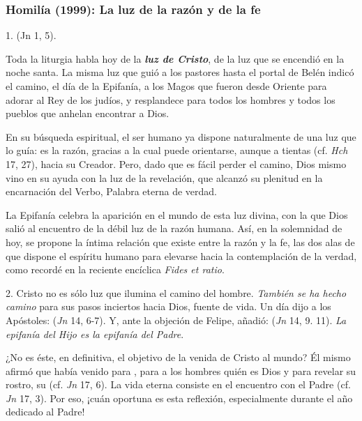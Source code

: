 			\subsubsection{Homilía (1999): La luz de la razón y de la fe}
			
				
				\begin{body}
					1.  (Jn 1, 5).
					
					Toda la liturgia habla hoy de la \emph{\textbf{luz de Cristo}}, de la luz que se encendió en la noche santa. La misma luz que guió a los pastores hasta el portal de Belén indicó el camino, el día de la Epifanía, a los Magos que fueron desde Oriente para adorar al Rey de los judíos, y resplandece para todos los hombres y todos los pueblos que anhelan encontrar a Dios.
					
					En su búsqueda espiritual, el ser humano ya dispone naturalmente de una luz que lo guía: es la razón, gracias a la cual puede orientarse, aunque a tientas (cf. \emph{Hch} 17, 27), hacia su Creador. Pero, dado que es fácil perder el camino, Dios mismo vino en su ayuda con la luz de la revelación, que alcanzó su plenitud en la encarnación del Verbo, Palabra eterna de verdad.
					
					La Epifanía celebra la aparición en el mundo de esta luz divina, con la que Dios salió al encuentro de la débil luz de la razón humana. Así, en la solemnidad de hoy, se propone la íntima relación que existe entre la razón y la fe, las dos alas de que dispone el espíritu humano para elevarse hacia la contemplación de la verdad, como recordé en la reciente encíclica \emph{Fides et ratio}.
					
					2. Cristo no es sólo luz que ilumina el camino del hombre. \emph{También se ha hecho camino} para sus pasos inciertos hacia Dios, fuente de vida. Un día dijo a los Apóstoles:  (\emph{Jn} 14, 6-7). Y, ante la objeción de Felipe, añadió:  (\emph{Jn} 14, 9. 11). \emph{La epifanía del Hijo es la epifanía del Padre}.
					
					¿No es éste, en definitiva, el objetivo de la venida de Cristo al mundo? Él mismo afirmó que había venido para , para  a los hombres quién es Dios y para revelar su rostro, su  (cf. \emph{Jn} 17, 6). La vida eterna consiste en el encuentro con el Padre (cf. \emph{Jn} 17, 3). Por eso, ¡cuán oportuna es esta reflexión, especialmente durante el año dedicado al Padre!
					

\end{body}
